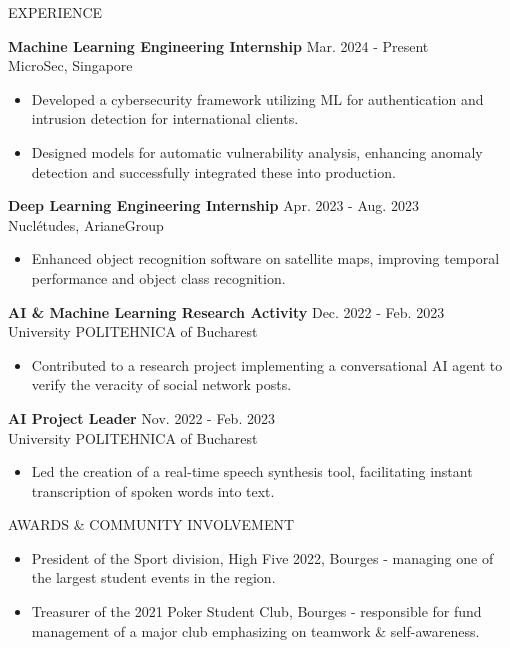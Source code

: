 \documentclass{resume} %
\begin{document}
\begin{rSection}{EXPERIENCE}

\textbf{Machine Learning Engineering Internship} \hfill {Mar. 2024 - Present}\\
MicroSec, Singapore
 \begin{itemize}
    \item Developed a cybersecurity framework utilizing ML for authentication and intrusion detection for international clients.
    \item Designed models for automatic vulnerability analysis, enhancing anomaly detection and successfully integrated these into production.
 \end{itemize}

\textbf{Deep Learning Engineering Internship} \hfill {Apr. 2023 - Aug. 2023}\\
Nuclétudes, ArianeGroup
 \begin{itemize}
    \item Enhanced object recognition software on satellite maps, improving temporal performance and object class recognition.
 \end{itemize}
 
\textbf{AI \& Machine Learning Research Activity} \hfill {Dec. 2022 - Feb. 2023}\\
University POLITEHNICA of Bucharest
 \begin{itemize}
    \item Contributed to a research project implementing a conversational AI agent to verify the veracity of social network posts.
 \end{itemize}

\textbf{AI Project Leader} \hfill {Nov. 2022 - Feb. 2023}\\
University POLITEHNICA of Bucharest
 \begin{itemize}
    \item Led the creation of a real-time speech synthesis tool, facilitating instant transcription of spoken words into text.
 \end{itemize}

\end{rSection} 


\begin{rSection}{AWARDS \& COMMUNITY INVOLVEMENT}

\begin{itemize}
    \item President of the Sport division, High Five 2022, Bourges - managing one of the largest student events in the region.
    \item Treasurer of the 2021 Poker Student Club, Bourges - responsible for fund management of a major club emphasizing on teamwork \& self-awareness.
\end{itemize}

\end{rSection}
\end{document}
